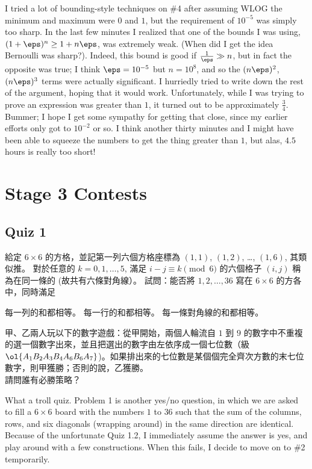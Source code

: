 \documentclass[11pt]{scrreprt}
\begin{document}
I tried a lot of bounding-style techniques on \#4 after assuming WLOG the
minimum and maximum were $0$ and $1$, but the requirement of $10^{-5}$ was simply too sharp.
In the last few minutes I realized that one of the bounds I was using, $(1+\eps)^n \ge 1+n\eps$,
was extremely weak. (When did I get the idea Bernoulli was sharp?).
Indeed, this bound is good if $\frac{1}{\eps} \gg n$, but in fact the opposite was true;
I think $\eps = 10^{-5}$ but $n = 10^{8}$, and so the $(n\eps)^2$,
$(n\eps)^3$ terms were actually significant.
I hurriedly tried to write down the rest of the argument, hoping that it would work.
Unfortunately, while I was trying to prove an expression was greater than $1$,
it turned out to be approximately $\frac 34$.
Bummer; I hope I get some sympathy for getting that close,
since my earlier efforts only got to $10^{-2}$ or so.
I think another thirty minutes and I might have been able to squeeze the numbers
to get the thing greater than $1$, but alas, $4.5$ hours is really too short!



\section{Stage 3 Contests}
\subsection{Quiz 1}
\begin{enumerate}
  \ii 給定 $6 \times 6$ 的方格，並記第一列六個方格座標為 $(1,1)$, $(1,2)$, \dots, $(1,6)$, 其類似推。
  對於任意的 $k=0,1,\dots,5$, 滿足 $i-j \equiv k \pmod 6$ 的六個格子 $(i,j)$ 稱為在同一條的 (故共有六條對角線）。
  試問：能否將 $1,2,\dots,36$ 寫在 $6 \times 6$ 的方各中，同時滿足
  \begin{enumerate}[(1)]
    \ii 每一列的和都相等。
    \ii 每一行的和都相等。
    \ii 每一條對角線的和都相等。
  \end{enumerate}
  \ii 甲、乙兩人玩以下的數字遊戲：從甲開始，兩個人輪流自 $1$ 到 $9$ 的數字中不重複的選一個數字出來，並且把選出的數字由左依序成一個七位數（級 $\ol{A_1B_2A_3B_4A_6B_6A_7}$)。如果排出來的七位數是某個個完全齊次方數的末七位數字，則甲獲勝；否則的說，乙獲勝。 \\
  請問誰有必勝策略？
\end{enumerate}
What a troll quiz. Problem 1 is another yes/no question,
in which we are asked to fill a $6 \times 6$ board with the numbers $1$ to $36$
such that the sum of the columns, rows,
and six diagonals (wrapping around) in the same direction are identical.
Because of the unfortunate Quiz 1.2, I immediately assume the answer is yes,
and play around with a few constructions. When this fails, I decide to move on to \#2 temporarily.
\end{document}
